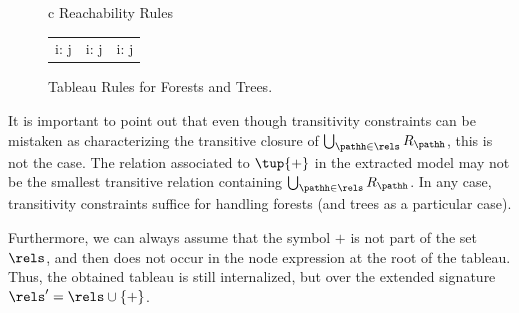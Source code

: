 \begin{figure}[t]%
    \begin{center}
        \small 
        {\def\arraystretch{1.2}
        \begin{tabular}{c}
            \toprule
            {\sc Reachability Rules}
            \tabularnewline
            \midrule
            {
            \begin{tabular}{ccc}
                {\infer[(+\mathrm{intro})]
                { i{:}\tup{+} j}
                { i{:}\tup{\pathh} j}
                }
                &
                {\infer[(\mathrm{trans})]
                    {i{:} \tup{+} k}
                    {\deduce[]
                    { j{:}\tup{+} k}
                    {i{:}\tup{+} j} 
                    }
                }
                &
                {\infer[(+\mathrm{copy})]
                    {i{:}\tup{+} k}
                    {\deduce[]
                    {\phantom{|} j{:}k} 
                    {\phantom{|} i{:}\tup{\pathh} j}}
                }
            \end{tabular}
            }
            \tabularnewline
            \bottomrule                        
        \end{tabular}}
    \end{center}
    \caption{Tableau Rules for Forests and Trees.}
    \label{rules:reachability}
\end{figure}


\begin{rem}
     It is important to point out that even though transitivity constraints can be mistaken as characterizing the transitive closure of $\bigcup_{\pathh \in \rels} R_{\pathh}$, this is not the case. The relation associated to $\tup{+}$ in the extracted model may not be the smallest transitive relation containing $\bigcup_{\pathh \in \rels} R_{\pathh}$.
    In any case, transitivity constraints suffice for handling forests (and trees as a particular case).
    
    Furthermore, we can always assume that the symbol $+$ is not part of the set $\rels$, and then does not occur in the node expression at the root of the tableau. Thus, the obtained tableau is still internalized, but over the extended signature $\rels'=\rels\cup\{+\}$.
\end{rem}

